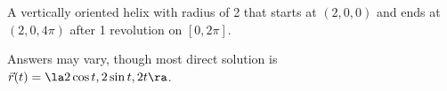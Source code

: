 {A vertically oriented helix with radius of 2 that starts at $(2,0,0)$ and ends at $(2,0,4\pi)$ after 1 revolution on $[0,2\pi]$. 
}
{
Answers may vary, though most direct solution is\\
$\vec r(t) = \la 2\cos t,2\sin t,2t\ra $.

}


